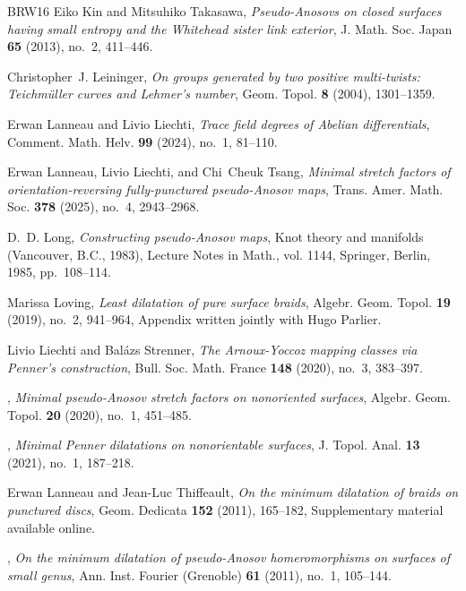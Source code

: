 \documentclass{amsart}
\theoremstyle{definition}
\theoremstyle{remark}
\begin{document}
\begin{thebibliography}{BRW16}
Eiko Kin and Mitsuhiko Takasawa, \emph{Pseudo-{A}nosovs on closed surfaces
  having small entropy and the {W}hitehead sister link exterior}, J. Math. Soc.
  Japan \textbf{65} (2013), no.~2, 411--446. 

Christopher~J. Leininger, \emph{On groups generated by two positive
  multi-twists: {T}eichm\"{u}ller curves and {L}ehmer's number}, Geom. Topol.
  \textbf{8} (2004), 1301--1359. 

Erwan Lanneau and Livio Liechti, \emph{Trace field degrees of {A}belian
  differentials}, Comment. Math. Helv. \textbf{99} (2024), no.~1, 81--110.

Erwan Lanneau, Livio Liechti, and Chi~Cheuk Tsang, \emph{Minimal stretch
  factors of orientation-reversing fully-punctured pseudo-{A}nosov maps},
  Trans. Amer. Math. Soc. \textbf{378} (2025), no.~4, 2943--2968. 

D.~D. Long, \emph{Constructing pseudo-{A}nosov maps}, Knot theory and manifolds
  ({V}ancouver, {B}.{C}., 1983), Lecture Notes in Math., vol. 1144, Springer,
  Berlin, 1985, pp.~108--114. 

Marissa Loving, \emph{Least dilatation of pure surface braids}, Algebr. Geom.
  Topol. \textbf{19} (2019), no.~2, 941--964, Appendix written jointly with
  Hugo Parlier. 

Livio Liechti and Bal\'azs Strenner, \emph{The {A}rnoux-{Y}occoz mapping
  classes via {P}enner's construction}, Bull. Soc. Math. France \textbf{148}
  (2020), no.~3, 383--397. 

\bysame, \emph{Minimal pseudo-{A}nosov stretch factors on nonoriented
  surfaces}, Algebr. Geom. Topol. \textbf{20} (2020), no.~1, 451--485.

\bysame, \emph{Minimal {P}enner dilatations on nonorientable surfaces}, J.
  Topol. Anal. \textbf{13} (2021), no.~1, 187--218. 

Erwan Lanneau and Jean-Luc Thiffeault, \emph{On the minimum dilatation of
  braids on punctured discs}, Geom. Dedicata \textbf{152} (2011), 165--182,
  Supplementary material available online. 

\bysame, \emph{On the minimum dilatation of pseudo-{A}nosov homeromorphisms on
  surfaces of small genus}, Ann. Inst. Fourier (Grenoble) \textbf{61} (2011),
  no.~1, 105--144. 


\end{thebibliography}
\end{document}
